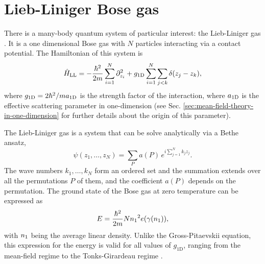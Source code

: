 





\section{Lieb-Liniger Bose gas}

There is a many-body quantum system of particular interest: the Lieb-Liniger gas
\cite{bib:lieb-phys-rev.130.1605.1963}. It is a one dimensional Bose gas with
$N$ particles interacting via a contact potential. The Hamiltonian of this
system is
%
\begin{equation}
  \label{eq:lieb-liniger-hamiltonian}
  {\hat{H}}_{\mathrm{LL}} = -\frac{\hbar^2}{2m} \sum_{i=1}^{N} \partial^2_{z_i} + g_{1\mathrm{D}} \sum_{i=1}^{N} \sum_{j < k} \delta(z_j - z_k),
\end{equation}
%
where $g_{1\mathrm{D}} = 2\hbar^2 / m a_{ \mathrm{1D} }$ is the strength factor of the
interaction,
where $a_{ \mathrm{1D} }$ is the effective scattering parameter in one-dimension (see
Sec. \ref{sec:mean-field-theory-in-one-dimension} for further details about the
origin of this parameter).

The Lieb-Liniger gas is a system that can be solve analytically via a Bethe
ansatz,
%
\begin{equation}
  \psi(z_1, \ldots, z_N) = \sum_{P} a(P) \, e^{i \sum_{j=1}^{N} k_j z_j}.
\end{equation}
%
The wave numbers $k_1, \ldots, k_N$ form an ordered set and the summation
extends over all the permutations $P$ of them, and the coefficient $a(P)$
depends on the permutation. The ground state of the Bose gas at zero temperature
can be expressed as
%
\begin{equation}
  \label{eq:lieb-liniger-energy}
  E =\frac{\hbar^2}{2m} N {{n}_1}^2 e(\gamma({{n}_1})),
\end{equation}
%
with ${{n}_1}$ being the average linear density. Unlike the Gross-Pitaevskii
equation, this expression for the energy is valid for all values of
$g_{\mathrm{1D}}$, ranging from the mean-field regime to the Tonks-Girardeau
regime \cite[]{bib:tonks-phys-rev.50.955.1936, bib:girardeau-j-math-phys.1960}.

